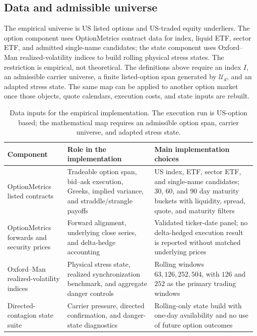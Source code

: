 \documentclass[11pt,a4paper]{amsart}
\newcommand{\tablecaptionskip}{\vspace{0.18em}}
\theoremstyle{plain}
\theoremstyle{definition}
\theoremstyle{remark}
\newcommand{\cU}{\mathcal{U}}
\begin{document}
\subsection{Data and admissible universe}\label{subsec:data-universe}

The empirical universe is US listed options and US-traded equity underliers.  The option component
uses OptionMetrics contract data for index, liquid ETF, sector ETF, and admitted single-name
candidates; the state component uses Oxford--Man realized-volatility indices to build rolling
physical stress states.  The restriction is empirical, not theoretical.  The definitions above require an index
\(I\), an admissible carrier universe, a finite listed-option span generated by \(\cU_d\), and an
adapted stress state.  The same map can be applied to another option market once those
objects, quote calendars, execution costs, and state inputs are rebuilt.

\begin{table}[H]
\centering
\caption{Data inputs for the empirical implementation.  The execution run is US-option based;
the mathematical map requires an admissible option span, carrier universe, and adapted
stress state.}
\tablecaptionskip
\small
\begin{tabular}{@{}L{0.22\textwidth}L{0.36\textwidth}L{0.35\textwidth}@{}}
\toprule
\textbf{Component} & \textbf{Role in the implementation} & \textbf{Main implementation choices}\\
\midrule
OptionMetrics listed contracts & Tradeable option span, bid--ask execution, Greeks, implied
variance, and straddle/strangle payoffs & US index, ETF, sector ETF, and single-name candidates;
30, 60, and 90 day maturity buckets with liquidity, spread, quote, and maturity filters\\
OptionMetrics forwards and security prices & Forward alignment, underlying close series, and
delta-hedge accounting & Validated ticker-date panel; no delta-hedged execution result is reported
without matched underlying prices\\
Oxford--Man realized-volatility indices & Physical stress state, realized synchronization
benchmark, and aggregate danger controls & Rolling windows \(63,126,252,504\), with \(126\) and
\(252\) as the primary trading windows\\
Directed-contagion state suite & Carrier pressure, directed confirmation, and danger-state
diagnostics & Rolling-only state build with one-day availability and no use of future option
outcomes\\
\bottomrule
\end{tabular}
\label{tab:data-layers}
\end{table}
\end{document}
